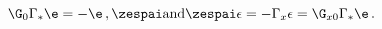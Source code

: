 \begin{equation}
\G_0\Gamma _*\e=-\e  \,, \zespai \textrm{and} \zespai \epsilon =-\Gamma
_x\epsilon =\G_{x0}\Gamma _*\e \,.
\end{equation}

